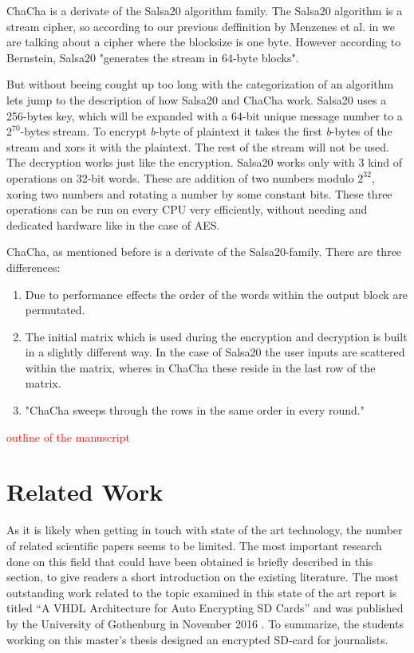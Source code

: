\documentclass[12pt,a4paper,titlepage,oneside]{scrartcl}
\newcommand\todo[1]{\textcolor{red}{#1}}
\begin{document}
ChaCha is a derivate of the Salsa20 algorithm family. 
The Salsa20 algorithm is a stream cipher, so according to our previous deffinition by Menzenes et al. in \cite{menezes1996handbook} we are talking about a cipher where the blocksize is one byte.
However according to Bernstein, Salsa20 "generates the stream in 64-byte blocks". \cite{bernstein2008salsa20}

But without beeing cought up too long with the categorization of an algorithm lets jump to the description of how Salsa20 and ChaCha work.
Salsa20 uses a 256-bytes key, which will be expanded with a 64-bit unique message number to a \begin{math} 2^{70} \end{math}-bytes stream.
To encrypt \textit{b}-byte of plaintext it takes the first \textit{b}-bytes of the stream and xors it with the plaintext.
The rest of the stream will not be used.
The decryption works just like the encryption.
Salsa20 works only with 3 kind of operations on 32-bit words.
These are addition of two numbers modulo \begin{math} 2^{32} \end{math}, xoring two numbers and rotating a number by some constant bits.
These three operations can be run on every CPU very efficiently, without needing and dedicated hardware like in the case of AES. \cite{bernstein2008salsa20}

ChaCha, as mentioned before is a derivate of the Salsa20-family.
There are three differences:
\begin{enumerate}
  \item Due to performance effects the order of the words within the output block are permutated.
  \item The initial matrix which is used during the encryption and decryption is built in a slightly different way.
    In the case of Salsa20 the user inputs are scattered within the matrix, wheres in ChaCha these reside in the last row of the matrix.
  \item "ChaCha sweeps through the rows in the same order in every round."
\end{enumerate}
\cite{bernstein2008chacha}

\todo{outline of the manuscript}


\newpage
\section{Related Work}
As it is likely when getting in touch with state of the art technology, the number of related scientific papers seems to be limited.
The most important research done on this field that could have been obtained is briefly described in this section, to give readers a short introduction on the existing literature. 
The most outstanding work related to the topic examined in this state of the art report is titled ``A VHDL Architecture for Auto Encrypting SD Cards'' and was published by the University of Gothenburg in November 2016 \cite{Davidsson2016}.
To summarize, the students working on this master's thesis designed an encrypted SD-card for journalists.
\end{document}
